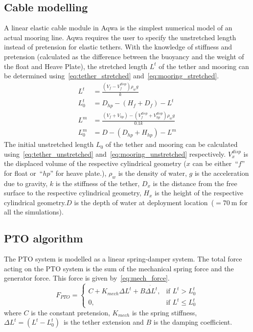 \documentclass[10pt,journal,a4paper,twoside]{./IMEJ}
\begin{document}
\subsection{Cable modelling}
A linear elastic cable module in Aqwa is the simplest numerical model of an actual mooring line. Aqwa requires the user to specify the unstretched length instead of pretension for elastic tethers. With the knowledge of stiffness and pretension (calculated as the difference between the buoyancy and the weight of the float and Heave Plate), the stretched length $L^{t}$ of the tether and mooring can be determined using~\eqref{eq:tether_stretched} and~\eqref{eq:mooring_stretched}.
\begin{align}
L^{t} &= \frac{(V_f-V_f^{disp})\rho_w g}{k} \label{eq:tether_stretched} \\
L_0^{t} &= D_{hp}-(H_f+D_f)-L^{t} \label{eq:tether_unstretched} \\
L^{m} &= \frac{(V_f+V_{hp})-(V_f^{disp}+V_{hp}^{disp})\rho_w g}{0.1k} \label{eq:mooring_stretched} \\
L_0^{m} &= D-(D_{hp}+H_{hp})-L^{m} \label{eq:mooring_unstretched}
\end{align}
The initial unstretched length $L_0$ of the tether and mooring can be calculated using~\eqref{eq:tether_unstretched} and~\eqref{eq:mooring_unstretched} respectively. $V_x^{disp}$ is the displaced volume of the respective cylindrical geometry ($x$ can be either~\enquote{$f$} for float or~\enquote{$hp$} for heave plate.), $\rho_w$ is the density of water, $g$ is the acceleration due to gravity, $k$ is the stiffness of the tether, $D_{x}$ is the distance from the free surface to the respective cylindrical geometry, $H_x$ is the height of the respective cylindrical geometry.$D$ is the depth of water at deployment location~($=70~\mathrm{m}$ for all the simulations).

\subsection{PTO algorithm}
\label{sec:pto_models}
The PTO system is modelled as a linear spring-damper system. The total force acting on the PTO system is the sum of the mechanical spring force and the generator force.
This force is given by~\eqref{eq:mech_force}.
\begin{equation}
F_{PTO} =
\begin{cases}
C + K_{mech}\Delta L^t + B \dot{\Delta L^t}, & \text{if } L^t > L_0^t \\
0, & \text{if } L^t \leq L_0^t
\end{cases}
\label{eq:mech_force}
\end{equation}
where $C$ is the constant pretension, $K_{mech}$ is the spring stiffness,~\(\Delta L^t =(L^t - L_0^t)\)~is the tether extension and $B$ is the damping coefficient.
\end{document}
